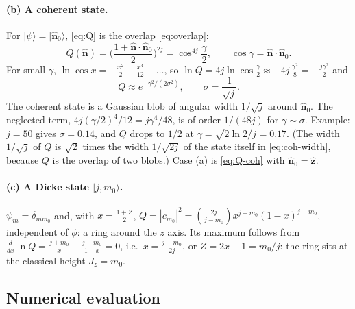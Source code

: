 \documentclass[11pt,a4paper]{article}
\newcommand{\vn}{\hat{\bm n}}
\begin{document}
\paragraph{(b) A coherent state.} For $|\psi\rangle = |\vn_0\rangle$, \eqref{eq:Q} is the overlap \eqref{eq:overlap}:
\begin{equation}\label{eq:Q-coh}
  Q(\vn) = \Big(\frac{1+\vn\cdot\vn_0}{2}\Big)^{2j} = \cos^{4j}\frac\gamma2,\qquad \cos\gamma = \vn\cdot\vn_0 .
\end{equation}
For small $\gamma$, $\ln\cos x = -\frac{x^2}{2} - \frac{x^4}{12} - \dots$, so $\ln Q = 4j\ln\cos\frac\gamma2 \approx
-4j\,\frac{\gamma^2}{8} = -\frac{j\gamma^2}{2}$ and
\begin{equation}\label{eq:Q-gauss}
  Q \approx e^{-\gamma^2/(2\sigma^2)},\qquad \sigma = \frac{1}{\sqrt j}.
\end{equation}
The coherent state is a Gaussian blob of angular width $1/\sqrt j$ around $\vn_0$. The neglected term,
$4j(\gamma/2)^4/12 = j\gamma^4/48$, is of order $1/(48j)$ for $\gamma\sim\sigma$. Example: $j = 50$ gives $\sigma =
0.14$, and $Q$ drops to $1/2$ at $\gamma = \sqrt{2\ln2/j} = 0.17$. (The width $1/\sqrt j$ of $Q$ is $\sqrt2$ times the
width $1/\sqrt{2j}$ of the state itself in \eqref{eq:coh-width}, because $Q$ is the overlap of two blobs.) Case (a) is
\eqref{eq:Q-coh} with $\vn_0 = \hat{\bm z}$.

\paragraph{(c) A Dicke state $|j,m_0\rangle$.} $\psi_m = \delta_{mm_0}$ and, with $x = \frac{1+Z}{2}$,
$Q = |c_{m_0}|^2 = \binom{2j}{j-m_0}x^{j+m_0}(1-x)^{j-m_0}$, independent of $\phi$: a ring around the $z$ axis. Its
maximum follows from $\frac{d}{dx}\ln Q = \frac{j+m_0}{x} - \frac{j-m_0}{1-x} = 0$, i.e.\ $x = \frac{j+m_0}{2j}$, or
$Z = 2x-1 = m_0/j$: the ring sits at the classical height $J_z = m_0$.

\subsection{Numerical evaluation}\label{sec:numerics}
\end{document}
